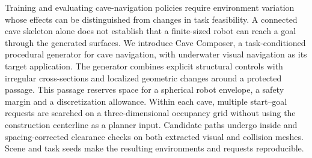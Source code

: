 Training and evaluating cave-navigation policies require environment variation whose effects can
be distinguished from changes in task feasibility. A connected cave skeleton
alone does not establish that a finite-sized robot can reach a goal through the
generated surfaces. We introduce Cave Composer, a task-conditioned procedural
generator for cave navigation, with underwater visual navigation as its target
application. The generator combines explicit structural controls with irregular
cross-sections and localized geometric changes around a protected passage.
This passage reserves space for a spherical robot envelope, a safety margin
and a discretization allowance. Within each cave, multiple start--goal requests
are searched on a three-dimensional occupancy grid without using the construction
centerline as a planner input. Candidate paths undergo inside and
spacing-corrected clearance checks on both extracted visual and collision meshes.
Scene and task seeds make the resulting environments and requests reproducible.
